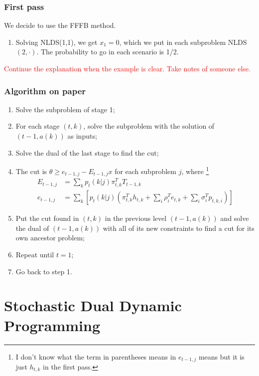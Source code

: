 \documentclass[12pt, openany]{report}
\theoremstyle{definition}
\begin{document}
\subsection{First pass}
We decide to use the FFFB method. 
\begin{enumerate}
	\item Solving NLDS(1,1), we get $x_1=0$, which we put in each subproblem NLDS$(2,\cdot)$. The probability to go in each scenario is 1/2. 
\end{enumerate}
\textcolor{red}{Continue the explanation when the example is clear. Take notes of someone else.}
\subsection{Algorithm on paper}
\begin{enumerate}
	\item Solve the subproblem of stage 1;
	\item For each stage $(t,k)$, solve the subproblem with the solution of $(t-1, a(k))$ as inputs;
	\item Solve the dual of the last stage to find the cut;
	\item The cut is $\theta \ge e_{t-1,j}-E_{t-1,j}x$ for each subproblem $j$, where \footnote{I don't know what the term in parentheses means in $e_{t-1,j}$ means but it is just $h_{t,k}$ in the first pass.}
	\begin{equation}
		\begin{aligned}
			E_{t-1,j} &= \sum_k p_t(k|j)\pi_{t,k}^T T_{t-1,k}\\
			e_{t-1,j} &= \sum_k \left[p_t(k|j)\left(\pi_{t,k}^T h_{t,k}+\sum_i \rho_i^T e_{t,k} + \sum_i \sigma_i^T p_{t,k,i}\right)\right]
		\end{aligned}
	\end{equation}
	\item Put the cut found in $(t,k)$ in the previous level $(t-1,a(k))$ and solve the dual of $(t-1,a(k))$ with all of its new constraints to find a cut for its own ancestor problem;
	\item Repeat until $t=1$;
	\item Go back to step 1.
\end{enumerate}
\chapter{Stochastic Dual Dynamic Programming}
\end{document}
